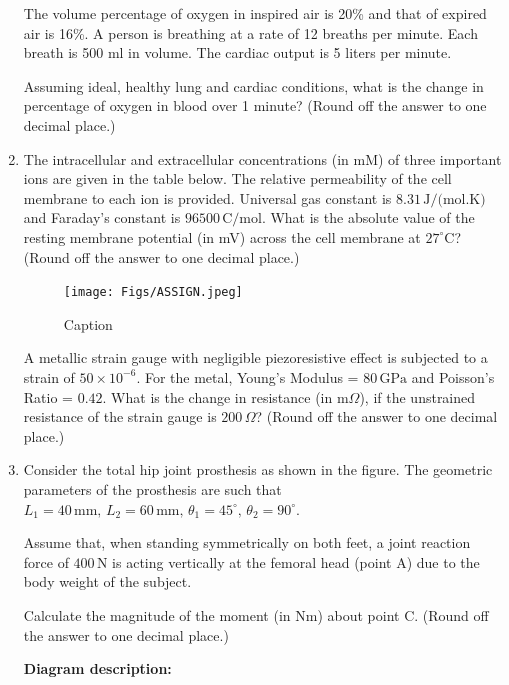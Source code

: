 \documentclass[journal]{IEEEtran}
\begin{document}
\begin{enumerate}
The volume percentage of oxygen in inspired air is 20\% and that of expired air is 16\%. A person is breathing at a rate of 12 breaths per minute. Each breath is 500 ml in volume. The cardiac output is 5 liters per minute.

\vspace{0.5em}
Assuming ideal, healthy lung and cardiac conditions, what is the change in percentage of oxygen in blood over 1 minute? (Round off the answer to one decimal place.)

\hfill{}

\item 
The intracellular and extracellular concentrations (in mM) of three important ions are given in the table below. The relative permeability of the cell membrane to each ion is provided. Universal gas constant is \( 8.31 \, \text{J/(mol.K)} \) and Faraday's constant is \( 96500 \, \text{C/mol} \).
What is the absolute value of the resting membrane potential (in mV) across the cell membrane at \( 27^\circ \text{C} \)? (Round off the answer to one decimal place.)

\begin{figure}[H]
    \centering
    \texttt{[image: Figs/ASSIGN.jpeg]}
    \caption{Caption}
    \label{fig:placeholder}
\end{figure}
\hfill{}


A metallic strain gauge with negligible piezoresistive effect is subjected to a strain of \( 50 \times 10^{-6} \). For the metal, Young's Modulus = \( 80 \, \text{GPa} \) and Poisson's Ratio = \( 0.42 \). What is the change in resistance (in m\(\Omega\)), if the unstrained resistance of the strain gauge is \( 200 \, \Omega \)? (Round off the answer to one decimal place.)
\hfill{}

\item 
Consider the total hip joint prosthesis as shown in the figure. The geometric parameters of the prosthesis are such that 
\( L_1 = 40 \, \text{mm}, \, L_2 = 60 \, \text{mm}, \, \theta_1 = 45^\circ, \, \theta_2 = 90^\circ \). 

Assume that, when standing symmetrically on both feet, a joint reaction force of \( 400 \, \text{N} \) is acting vertically at the femoral head (point A) due to the body weight of the subject. 

Calculate the magnitude of the moment (in Nm) about point C. (Round off the answer to one decimal place.)

\vspace{1em}
\textbf{Diagram description:}


\end{enumerate}
\end{document}
